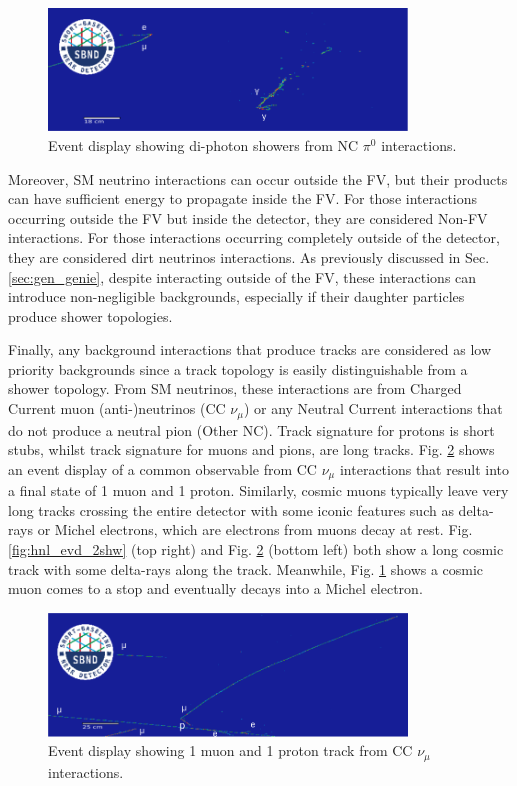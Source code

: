 \begin{figure}[htbp!]
	\centering
        \includegraphics[width=0.85\textwidth]{ncpi0}
        \caption{
		Event display showing di-photon showers from NC $\pi^0$ interactions. 
	}
	\label{fig:ncpi0_evd}
\end{figure}

Moreover, SM neutrino interactions can occur outside the FV, but their products can have sufficient energy to propagate inside the FV.
For those interactions occurring outside the FV but inside the detector, they are considered Non-FV interactions.
For those interactions occurring completely outside of the detector, they are considered dirt neutrinos interactions.
As previously discussed in Sec. \ref{sec:gen_genie}, despite interacting outside of the FV, these interactions can introduce non-negligible backgrounds, especially if their daughter particles produce shower topologies. 

Finally, any background interactions that produce tracks are considered as low priority backgrounds since a track topology is easily distinguishable from a shower topology.
From SM neutrinos, these interactions are from Charged Current muon (anti-)neutrinos (CC $\nu_\mu$) or any Neutral Current interactions that do not produce a neutral pion (Other NC).
Track signature for protons is short stubs, whilst track signature for muons and pions, are long tracks.
Fig. \ref{fig:numu_cos_evd} shows an event display of a common observable from CC $\nu_\mu$ interactions that result into a final state of 1 muon and 1 proton.
Similarly, cosmic muons typically leave very long tracks crossing the entire detector with some iconic features such as delta-rays or Michel electrons, which are electrons from muons decay at rest.
Fig. \ref{fig:hnl_evd_2shw} (top right) and Fig. \ref{fig:numu_cos_evd} (bottom left) both show a long cosmic track with some delta-rays along the track.
Meanwhile, Fig. \ref{fig:ncpi0_evd} shows a cosmic muon comes to a stop and eventually decays into a Michel electron.

\begin{figure}[htbp!]
	\centering
        \includegraphics[width=0.85\textwidth]{1m1p_cos}
        \caption{
		Event display showing 1 muon and 1 proton track from CC $\nu_\mu$ interactions. 
	}
	\label{fig:numu_cos_evd}
\end{figure}


